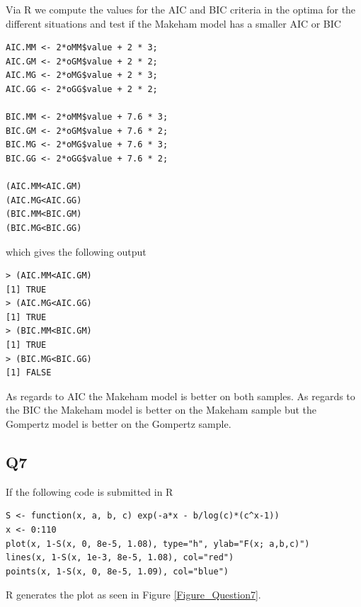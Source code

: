 \documentclass[11pt]{article}
\begin{document}
Via R we compute the values for the AIC and BIC criteria in the optima for the different situations and test if the Makeham model has a smaller AIC or BIC
\begin{verbatim}
AIC.MM <- 2*oMM$value + 2 * 3;
AIC.GM <- 2*oGM$value + 2 * 2;
AIC.MG <- 2*oMG$value + 2 * 3;
AIC.GG <- 2*oGG$value + 2 * 2;

BIC.MM <- 2*oMM$value + 7.6 * 3;
BIC.GM <- 2*oGM$value + 7.6 * 2;
BIC.MG <- 2*oMG$value + 7.6 * 3;
BIC.GG <- 2*oGG$value + 7.6 * 2;

(AIC.MM<AIC.GM)
(AIC.MG<AIC.GG)
(BIC.MM<BIC.GM)
(BIC.MG<BIC.GG)
\end{verbatim}
which gives the following output

\begin{verbatim}
> (AIC.MM<AIC.GM)
[1] TRUE
> (AIC.MG<AIC.GG)
[1] TRUE
> (BIC.MM<BIC.GM)
[1] TRUE
> (BIC.MG<BIC.GG)
[1] FALSE
\end{verbatim}

As regards to AIC the Makeham model is better on both samples. As regards to the BIC the Makeham model is better on the Makeham sample but the Gompertz model is better on the Gompertz sample.

\subsection*{Q7}

If the following code is submitted in R

\begin{verbatim}
S <- function(x, a, b, c) exp(-a*x - b/log(c)*(c^x-1))
x <- 0:110
plot(x, 1-S(x, 0, 8e-5, 1.08), type="h", ylab="F(x; a,b,c)")
lines(x, 1-S(x, 1e-3, 8e-5, 1.08), col="red")
points(x, 1-S(x, 0, 8e-5, 1.09), col="blue")
\end{verbatim}
R generates the plot as seen in Figure \ref{Figure_Question7}.
\end{document}
